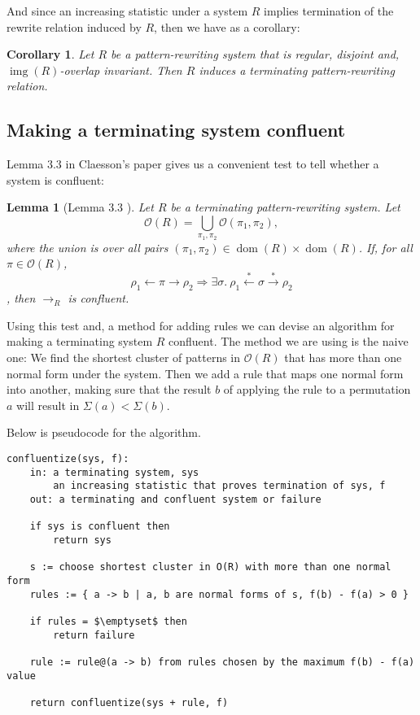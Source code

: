 \documentclass[a4paper, 11pt, english]{article}
\newtheorem{lemma}[theorem]{Lemma}
\newtheorem{corollary}[theorem]{Corollary}
\theoremstyle{definition}
\newcommand{\Ocal}{\mathcal{O}}
\newcommand{\from}{\leftarrow}
\newcommand{\tostar}{\stackrel{*}{\to}}
\newcommand{\fromstar}{\stackrel{*}{\from}}
\DeclareMathOperator{\dom}{dom}
\DeclareMathOperator{\img}{img}
\begin{document}
And since an increasing statistic under a system $R$ implies termination of the rewrite relation
induced by $R$, then we have as a corollary:

\begin{corollary}
    Let $R$ be a pattern-rewriting system that is regular, disjoint and, $\img(R)$-overlap invariant. 
    Then $R$ induces a terminating pattern-rewriting relation.
\end{corollary}

\subsection{Making a terminating system confluent}
Lemma $3.3$ in Claesson's paper gives us a convenient test to tell whether a system is
confluent:
\begin{lemma}[Lemma 3.3 \cite{claesson:2021}]
    Let $R$ be a terminating pattern-rewriting system. Let 
    \[
        \Ocal(R) = \bigcup_{\pi_1, \pi_2} \Ocal(\pi_1, \pi_2),
    \]
    where the union is over all pairs $(\pi_1, \pi_2) \in \dom(R) \times \dom(R)$. If, for all
    $\pi \in \Ocal(R)$,
    \[
        \rho_1 \from \pi \to \rho_2 \Longrightarrow \exists \sigma . \ \rho_1 \fromstar \sigma \tostar
        \rho_2 
    \],
    then $\to_R$ is confluent.
\end{lemma}
Using this test and, a method for adding rules we can devise an algorithm for making a terminating
system $R$ confluent. The method we are using is the
naive one: We find the shortest cluster of patterns in $\Ocal(R)$ that has more than one
normal form under the system. Then we add a rule that maps one normal form into another, making
sure that the result $b$ of applying the rule to a permutation $a$ will result in $\Sigma(a) <
\Sigma(b)$.

Below is pseudocode for the algorithm.

\lstset{basicstyle=\footnotesize\ttfamily, frame=single, breaklines=true,
mathescape=true}
\begin{minipage}{\linewidth}
\begin{lstlisting}[title={Algorithm 1}]
confluentize(sys, f):
    in: a terminating system, sys
        an increasing statistic that proves termination of sys, f
    out: a terminating and confluent system or failure

    if sys is confluent then
        return sys

    s := choose shortest cluster in O(R) with more than one normal form
    rules := { a -> b | a, b are normal forms of s, f(b) - f(a) > 0 }

    if rules = $\emptyset$ then
        return failure

    rule := rule@(a -> b) from rules chosen by the maximum f(b) - f(a) value

    return confluentize(sys + rule, f)
\end{lstlisting}
\end{minipage}
\end{document}
